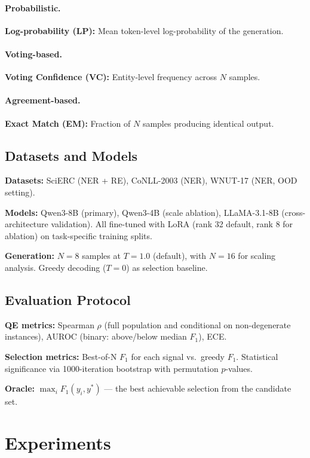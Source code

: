 \documentclass[11pt]{article}
\begin{document}
\paragraph{Probabilistic.} \textbf{Log-probability (LP):} Mean token-level log-probability of the generation.

\paragraph{Voting-based.} \textbf{Voting Confidence (VC):} Entity-level frequency across $N$ samples.

\paragraph{Agreement-based.} \textbf{Exact Match (EM):} Fraction of $N$ samples producing identical output.

\subsection{Datasets and Models}

\textbf{Datasets:} SciERC \cite{luan2018scierc} (NER + RE), CoNLL-2003 \cite{sang2003conll} (NER), WNUT-17 (NER, OOD setting).

\textbf{Models:} Qwen3-8B (primary), Qwen3-4B (scale ablation), LLaMA-3.1-8B (cross-architecture validation). All fine-tuned with LoRA (rank 32 default, rank 8 for ablation) on task-specific training splits.

\textbf{Generation:} $N = 8$ samples at $T = 1.0$ (default), with $N = 16$ for scaling analysis. Greedy decoding ($T = 0$) as selection baseline.

\subsection{Evaluation Protocol}

\textbf{QE metrics:} Spearman $\rho$ (full population and conditional on non-degenerate instances), AUROC (binary: above/below median $F_1$), ECE.

\textbf{Selection metrics:} Best-of-N $F_1$ for each signal vs.\ greedy $F_1$. Statistical significance via 1000-iteration bootstrap with permutation $p$-values.

\textbf{Oracle:} $\max_i F_1(y_i, y^*)$ --- the best achievable selection from the candidate set.

\section{Experiments}
\end{document}
